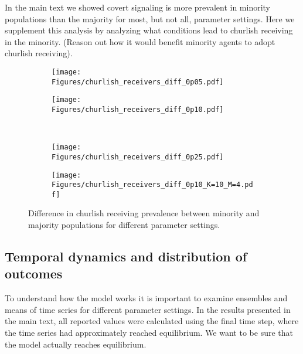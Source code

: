 \documentclass[11pt,letterpaper]{article}
\begin{document}
In the main text we showed covert signaling is more prevalent in minority 
populations than the majority for most, but not all, parameter settings. 
Here we supplement this analysis by analyzing what conditions lead to
churlish receiving in the minority. (Reason out how it would benefit minority
agents to adopt churlish receiving).

\begin{figure}[H]
  \centering
  \begin{subfigure}{0.48\textwidth}
    \centering
    \texttt{[image: Figures/churlish\_receivers\_diff\_0p05.pdf]}
  \end{subfigure}
  \hfill
  \begin{subfigure}{0.48\textwidth}
    \centering
    \texttt{[image: Figures/churlish\_receivers\_diff\_0p10.pdf]}
  \end{subfigure} \\[.25in]
  \begin{subfigure}{0.48\textwidth}
    \centering
    \texttt{[image: Figures/churlish\_receivers\_diff\_0p25.pdf]}
  \end{subfigure}
  \hfill
  \begin{subfigure}{0.48\textwidth}
    \centering
    \texttt{[image: Figures/churlish\_receivers\_diff\_0p10\_K=10\_M=4.pdf]}
  \end{subfigure}
  \caption{Difference in churlish receiving prevalence between minority and majority
  populations for different parameter settings.}
\end{figure}

\subsection{Temporal dynamics and distribution of outcomes}

To understand how the model works it is important to examine ensembles and
means of time series for different parameter settings. In the results presented
in the main text, all reported values were calculated using the final
time step, where the time series had approximately reached equilibrium.
We want to be sure that the model actually reaches equilibrium.
\end{document}
